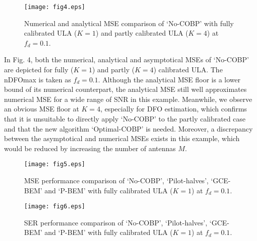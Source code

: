 \documentclass[12pt, draftclsnofoot, onecolumn]{IEEEtran}
\begin{document}
\begin{figure}[t]
\setlength{\abovecaptionskip}{-0.5cm}
\setlength{\belowcaptionskip}{-1.2cm}
\begin{center}
\texttt{[image: fig4.eps]}
\end{center}
\caption{ Numerical and analytical MSE comparison of `No-COBP' with fully calibrated ULA ($K=1$) and partly calibrated ULA ($K=4$) at $f_d=0.1$. }
\end{figure}

In Fig. 4, both the numerical, analytical and asymptotical MSEs of `No-COBP' are depicted for fully ($K\!=\!1$) and partly ($K\!=\!4$) calibrated ULA. The nDFOmax is taken as $f_d \!=\! 0.1$. Although the analytical MSE floor is a lower bound of its numerical counterpart, the analytical MSE still well approximates numerical MSE for a wide range of SNR in this example. Meanwhile, we observe an obvious MSE floor at $K\!=\!4$, especially for DFO estimation, which confirms that it is unsuitable to directly apply `No-COBP' to the partly calibrated case and that the new algorithm `Optimal-COBP' is needed. Moreover, a discrepancy between the asymptotical and numerical MSEs exists in this example, which would be reduced by increasing the number of antennas $M$.

\begin{figure}[htbp]
\vspace{-1.5em}
\setlength{\abovecaptionskip}{-0.2cm}
\setlength{\belowcaptionskip}{-0.85cm}
  \centering
  \begin{minipage}{80mm}
  \centering
    \texttt{[image: fig5.eps]}
    \caption{ MSE performance comparison of `No-COBP', `Pilot-halves', `GCE-BEM' and `P-BEM' with fully calibrated ULA ($K=1$) at $f_d=0.1$. }
  \end{minipage}
  \begin{minipage}{80mm}
  \centering
    \texttt{[image: fig6.eps]}
    \caption{ SER performance comparison of `No-COBP', `Pilot-halves', `GCE-BEM' and `P-BEM' with fully calibrated ULA ($K=1$) at $f_d=0.1$. }
  \end{minipage}
\end{figure}
\end{document}
